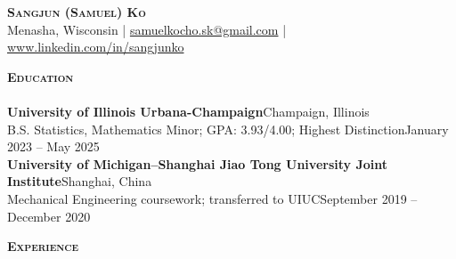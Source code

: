 \documentclass[letterpaper,10pt]{article}
\newcommand{\lineunder}{
    \vspace*{-8pt} \\
    \hspace*{-18pt} \hrulefill \\
}
\newcommand{\header}[1]{
    \Needspace{4\baselineskip}
    {\hspace*{-18pt}\vspace*{4pt} \textsc{#1}}
    \vspace*{-6pt} \lineunder
}
\begin{document}
\vspace*{-30pt}

\begin{center}
    {\Huge \scshape \textbf{Sangjun (Samuel) Ko}}\\
    Menasha, Wisconsin
    | \href{mailto:samuelkocho.sk@gmail.com}{samuelkocho.sk@gmail.com}
    | \href{https://www.linkedin.com/in/sangjunko}{www.linkedin.com/in/sangjunko}
\end{center}
\vspace*{-8pt}

\header{\textbf{Education}}
\textbf{University of Illinois Urbana-Champaign}\hfill Champaign, Illinois\\
B.S. Statistics, Mathematics Minor; GPA: 3.93/4.00; Highest Distinction\hfill January 2023 -- May 2025\\[-1pt]
\textbf{University of Michigan--Shanghai Jiao Tong University Joint Institute}\hfill Shanghai, China\\
Mechanical Engineering coursework; transferred to UIUC\hfill September 2019 -- December 2020\\[-1pt]

\vspace*{1mm}
\header{\textbf{Experience}}
\end{document}
